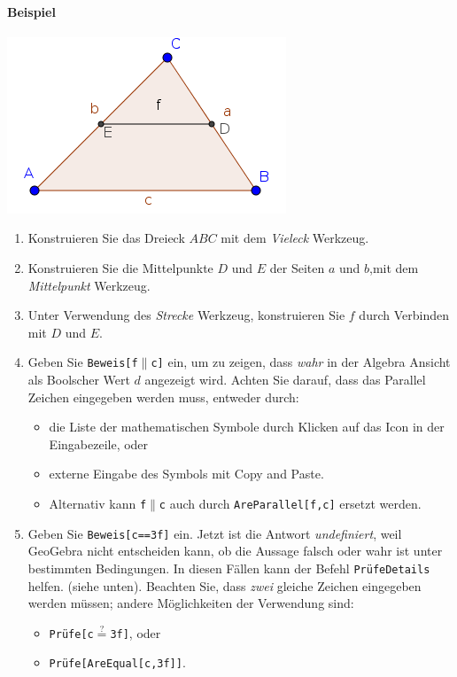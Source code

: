 \documentclass{article}
\begin{document}

\paragraph{Beispiel}
\begin{center}
\includegraphics[scale=0.5]{Prove-example}
\end{center}
\begin{enumerate}
\item Konstruieren Sie das Dreieck $ABC$ mit dem \textit{Vieleck} Werkzeug.
\item Konstruieren Sie die Mittelpunkte $D$ und $E$ der Seiten $a$ und $b$,mit dem \textit{Mittelpunkt} Werkzeug.
\item Unter Verwendung des \textit{Strecke} Werkzeug, konstruieren Sie $f$ durch Verbinden mit $D$ und $E$.
\item Geben Sie \texttt{Beweis[f$\parallel$c]} ein, um zu zeigen, dass \textit{wahr} in der Algebra Ansicht als Boolscher Wert $d$ angezeigt wird. Achten Sie darauf, dass das Parallel Zeichen eingegeben werden muss, entweder durch:
\begin{itemize}
\item die Liste der mathematischen Symbole durch Klicken auf das \framebox{$\alpha$} Icon in der Eingabezeile, oder
\item externe Eingabe des Symbols mit Copy and Paste.
\item Alternativ kann \texttt{f$\parallel$c} auch durch \texttt{AreParallel[f,c]} ersetzt werden.
\end{itemize}

\item Geben Sie \texttt{Beweis[c==3f]} ein. Jetzt ist die Antwort \textit{undefiniert}, weil GeoGebra nicht entscheiden kann, ob die Aussage falsch oder wahr ist unter bestimmten Bedingungen. In diesen Fällen kann der Befehl \texttt{PrüfeDetails} helfen. (siehe unten). Beachten Sie, dass \textit{zwei} gleiche Zeichen eingegeben werden müssen; andere Möglichkeiten der Verwendung sind:
\begin{itemize}
    \item \texttt{Prüfe[c$\stackrel{?}{=}$3f]}, oder
    \item \texttt{Prüfe[AreEqual[c,3f]]}.
\end{itemize}

\end{enumerate}
\end{document}
